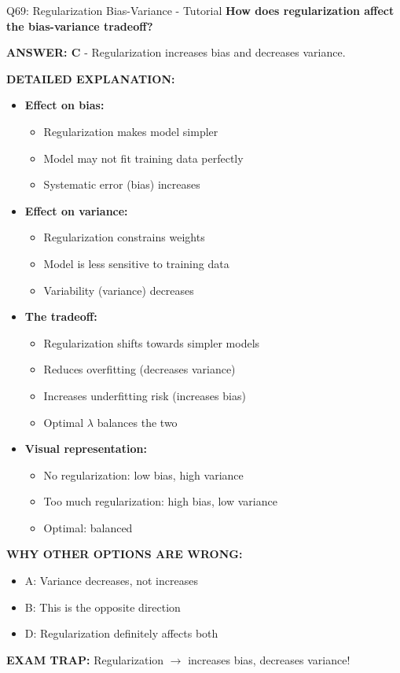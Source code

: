 \documentclass[8pt]{beamer}
\begin{document}
	\begin{frame}{Q69: Regularization Bias-Variance - Tutorial}
		\fontsize{6.5}{7.5}\selectfont
		\textbf{How does regularization affect the bias-variance tradeoff?}
		
		\vspace{0.05cm}
		\textcolor{myblue}{\textbf{ANSWER: C}} - Regularization increases bias and decreases variance.
		
		\vspace{0.05cm}
		\textbf{DETAILED EXPLANATION:}
		\begin{itemize}
			\item \textbf{Effect on bias:}
			\begin{itemize}
				\item Regularization makes model simpler
				\item Model may not fit training data perfectly
				\item Systematic error (bias) increases
			\end{itemize}
			\item \textbf{Effect on variance:}
			\begin{itemize}
				\item Regularization constrains weights
				\item Model is less sensitive to training data
				\item Variability (variance) decreases
			\end{itemize}
			\item \textbf{The tradeoff:}
			\begin{itemize}
				\item Regularization shifts towards simpler models
				\item Reduces overfitting (decreases variance)
				\item Increases underfitting risk (increases bias)
				\item Optimal $\lambda$ balances the two
			\end{itemize}
			\item \textbf{Visual representation:}
			\begin{itemize}
				\item No regularization: low bias, high variance
				\item Too much regularization: high bias, low variance
				\item Optimal: balanced
			\end{itemize}
		\end{itemize}
		
		\vspace{0.05cm}
		\textcolor{myred}{\textbf{WHY OTHER OPTIONS ARE WRONG:}}
		\begin{itemize}
			\item \textcolor{myred}{A:} Variance decreases, not increases
			\item \textcolor{myred}{B:} This is the opposite direction
			\item \textcolor{myred}{D:} Regularization definitely affects both
		\end{itemize}
		
		\textcolor{myred}{\textbf{EXAM TRAP:}} Regularization $\to$ increases bias, decreases variance!
	\end{frame}
	
\end{document}
